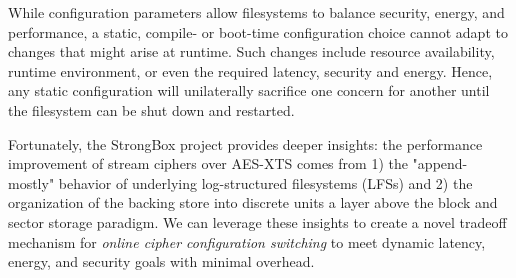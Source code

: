 While configuration parameters allow filesystems to balance security, energy,
and performance, a static,  compile- or boot-time configuration choice cannot
adapt to changes that might arise at runtime.  Such changes include resource
availability, runtime environment, or even the required latency, security and
energy. Hence, any static configuration will unilaterally sacrifice one concern
for another until the filesystem can be shut down and restarted.

Fortunately, the StrongBox project provides deeper insights: the performance
improvement of stream ciphers over AES-XTS comes from 1) the "append-mostly"
behavior of underlying log-structured filesystems (LFSs) and 2) the organization
of the backing store into discrete units a layer above the block and sector
storage paradigm. We can leverage these insights to create a novel tradeoff
mechanism for \emph{online cipher configuration switching} to meet dynamic
latency, energy, and security goals with minimal overhead.


